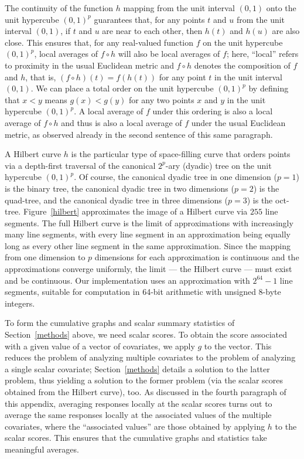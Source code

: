 \documentclass[]{fairmeta}
\begin{document}
The continuity of the function $h$ mapping from the unit interval $(0, 1)$
onto the unit hypercube $(0, 1)^p$ guarantees that,
for any points $t$ and $u$ from the unit interval $(0, 1)$,
if $t$ and $u$ are near to each other, then $h(t)$ and $h(u)$ are also close.
This ensures that, for any real-valued function $f$
on the unit hypercube $(0, 1)^p$,
local averages of $f \circ h$ will also be local averages of $f$;
here, ``local'' refers to proximity in the usual Euclidean metric
and $f \circ h$ denotes the composition of $f$ and $h$, that is,
$(f \circ h)(t) = f(h(t))$ for any point $t$ in the unit interval $(0, 1)$.
We can place a total order on the unit hypercube $(0, 1)^p$ by defining
that $x < y$ means $g(x) < g(y)$
for any two points $x$ and $y$ in the unit hypercube $(0, 1)^p$.
A local average of $f$ under this ordering
is also a local average of $f \circ h$ and thus is also a local average of $f$
under the usual Euclidean metric, as observed already
in the second sentence of this same paragraph.

A Hilbert curve $h$ is the particular type of space-filling curve
that orders points via a depth-first traversal
of the canonical $2^p$-ary (dyadic) tree on the unit hypercube $(0, 1)^p$.
Of course, the canonical dyadic tree in one dimension ($p = 1$)
is the binary tree, the canonical dyadic tree in two dimensions ($p = 2$)
is the quad-tree, and the canonical dyadic tree in three dimensions ($p = 3$)
is the oct-tree.
Figure~\ref{hilbert} approximates the image of a Hilbert curve
via $255$ line segments.
The full Hilbert curve is the limit of approximations
with increasingly many line segments, with every line segment
in an approximation being equally long as every other line segment
in the same approximation. Since the mapping from one dimension
to $p$ dimensions for each approximation is continuous
and the approximations converge uniformly, the limit --- the Hilbert curve ---
must exist and be continuous.
Our implementation uses an approximation with $2^{64} - 1$ line segments,
suitable for computation in 64-bit arithmetic with unsigned 8-byte integers.

To form the cumulative graphs and scalar summary statistics
of Section~\ref{methods} above, we need scalar scores.
To obtain the score associated with a given value of a vector of covariates,
we apply $g$ to the vector.
This reduces the problem of analyzing multiple covariates
to the problem of analyzing a single scalar covariate;
Section~\ref{methods} details a solution to the latter problem,
thus yielding a solution to the former problem (via the scalar scores
obtained from the Hilbert curve), too.
As discussed in the fourth paragraph of this appendix,
averaging responses locally at the scalar scores turns out
to average the same responses locally at the associated values
of the multiple covariates, where the ``associated values'' are those obtained
by applying $h$ to the scalar scores.
This ensures that the cumulative graphs and statistics
take meaningful averages.
\end{document}
